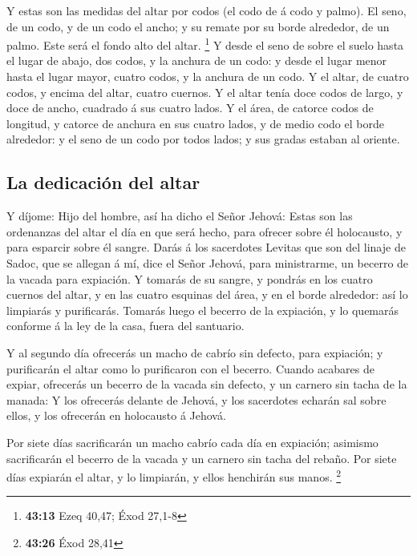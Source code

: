  Y estas son las medidas del altar por codos (el codo de á
codo y palmo). El seno, de un codo, y de un codo el ancho; y su remate
por su borde alrededor, de un palmo. Este será el fondo alto del altar.
\footnote{\textbf{43:13} Ezeq 40,47; Éxod 27,1-8}  Y desde
el seno de sobre el suelo hasta el lugar de abajo, dos codos, y la
anchura de un codo: y desde el lugar menor hasta el lugar mayor, cuatro
codos, y la anchura de un codo.  Y el altar, de cuatro
codos, y encima del altar, cuatro cuernos.  Y el altar
tenía doce codos de largo, y doce de ancho, cuadrado á sus cuatro lados.
 Y el área, de catorce codos de longitud, y catorce de
anchura en sus cuatro lados, y de medio codo el borde alrededor: y el
seno de un codo por todos lados; y sus gradas estaban al oriente.

\hypertarget{la-dedicaciuxf3n-del-altar}{%
\subsection{La dedicación del altar}\label{la-dedicaciuxf3n-del-altar}}

 Y díjome: Hijo del hombre, así ha dicho el Señor Jehová:
Estas son las ordenanzas del altar el día en que será hecho, para
ofrecer sobre él holocausto, y para esparcir sobre él sangre.
 Darás á los sacerdotes Levitas que son del linaje de
Sadoc, que se allegan á mí, dice el Señor Jehová, para ministrarme, un
becerro de la vacada para expiación.  Y tomarás de su
sangre, y pondrás en los cuatro cuernos del altar, y en las cuatro
esquinas del área, y en el borde alrededor: así lo limpiarás y
purificarás.  Tomarás luego el becerro de la expiación, y
lo quemarás conforme á la ley de la casa, fuera del santuario.

 Y al segundo día ofrecerás un macho de cabrío sin defecto,
para expiación; y purificarán el altar como lo purificaron con el
becerro.  Cuando acabares de expiar, ofrecerás un becerro
de la vacada sin defecto, y un carnero sin tacha de la manada:
 Y los ofrecerás delante de Jehová, y los sacerdotes
echarán sal sobre ellos, y los ofrecerán en holocausto á Jehová.

 Por siete días sacrificarán un macho cabrío cada día en
expiación; asimismo sacrificarán el becerro de la vacada y un carnero
sin tacha del rebaño.  Por siete días expiarán el altar, y
lo limpiarán, y ellos henchirán sus manos. \footnote{\textbf{43:26} Éxod
  28,41}

